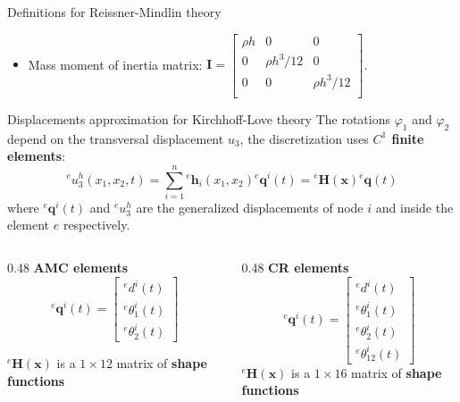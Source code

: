 \documentclass[aspectratio=169]{beamer}
\begin{document}
{\begin{frame}{Definitions for Reissner-Mindlin theory}
\begin{itemize}
{$$\begin{bmatrix}
                \nu & 1   & 0                 \\
                0   & 0   & \frac{1 - \nu}{2}
              \end{bmatrix}\qquad\text{and}\qquad \overline{\boldsymbol{C}_s}= \frac{Ekh}{2(1 + \nu)}\begin{bmatrix}
                1 & 0 \\
                0 & 1 \\
              \end{bmatrix}.$$}
      \item Mass moment of inertia matrix: {\small$\mathbf I=\begin{bmatrix}
                \rho h & 0           & 0           \\
                0      & \rho h^3/12 & 0           \\
                0      & 0           & \rho h^3/12 \\
              \end{bmatrix}$}.
    \end{itemize}
  \end{frame}

  \begin{frame}{Displacements approximation for Kirchhoff-Love theory}
    The rotations $\varphi_1$ and $\varphi_2$ depend on the transversal displacement $u_3$, the discretization uses \textbf{$C^1$ finite elements}:
    $${}^eu_3^h(x_1, x_2, t) = \sum_{i=1}^{n} {}^e\mathbf h_i(x_1, x_2) {}^e\mathbf  q^i(t) = {}^e\mathbf{H}(\mathbf x){}^e\mathbf{q}(t)$$
    where ${}^e\mathbf q^i(t)$ and ${}^e u^h_3$ are the generalized displacements of node $i$ and inside the element $e$ respectively.
    \begin{columns}[T,onlytextwidth]
      \begin{column}{0.48\textwidth}
        \textbf{AMC elements}
        $${}^e\mathbf q^i(t)=\begin{bmatrix}
            {}^e d^{i}(t) \\ {}^e \theta^{i}_1(t) \\ {}^e \theta^{i}_2(t)
          \end{bmatrix}$$
        \vspace{0.3cm}

        ${}^e\mathbf H(\mathbf x)$ is a $1\times 12$ matrix of \textbf{shape functions}
      \end{column}
      \begin{column}{0.48\textwidth}
        \textbf{CR elements}
        $${}^e\mathbf q^i(t)=\begin{bmatrix}
            {}^e d^{i}(t) \\ {}^e \theta^{i}_1(t) \\ {}^e \theta^{i}_2(t) \\ {}^e \theta^{i}_{12}(t)
          \end{bmatrix}$$
        ${}^e\mathbf H(\mathbf x)$ is a $1\times 16$ matrix of \textbf{shape functions}
      \end{column}
    \end{columns}
  \end{frame}

}
\end{document}
